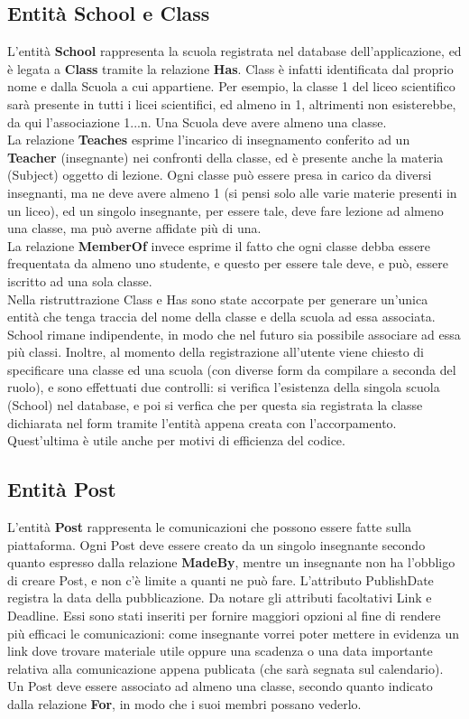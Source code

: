 \documentclass[Lau, binding=0.6cm, oneside]{sapthesis}
\begin{document}
\subsection{Entità School e Class}
L'entità \textbf{School} rappresenta la scuola registrata nel database dell'applicazione, ed è legata a \textbf{Class} tramite la relazione \textbf{Has}. Class è infatti identificata dal proprio nome e dalla Scuola a cui appartiene. Per esempio, la classe 1 del liceo scientifico sarà presente in tutti i licei scientifici, ed almeno in 1, altrimenti non esisterebbe, da qui l'associazione 1...n. Una Scuola deve avere almeno una classe.\\
La relazione \textbf{Teaches} esprime l'incarico di insegnamento conferito ad un \textbf{Teacher} (insegnante) nei confronti della classe, ed è presente anche la materia (Subject) oggetto di lezione. Ogni classe può essere presa in carico da diversi insegnanti, ma ne deve avere almeno 1 (si pensi solo alle varie materie presenti in  un liceo), ed un singolo insegnante, per essere tale, deve fare lezione ad almeno una classe, ma può averne affidate più di una.\\
La relazione \textbf{MemberOf} invece esprime il fatto che ogni classe debba essere frequentata da almeno uno studente, e questo per essere tale deve, e può, essere iscritto ad una sola classe.\\
Nella ristruttrazione Class e Has sono state accorpate per generare un'unica entità che tenga traccia del nome della classe e della scuola ad essa associata. School rimane indipendente, in modo che nel futuro sia possibile associare ad essa più classi. Inoltre, al momento della registrazione
all'utente viene chiesto di specificare una classe ed una scuola (con diverse form da compilare a seconda del ruolo), e sono effettuati due controlli: si verifica l'esistenza della singola scuola (School) nel database, e poi si verfica che per questa sia registrata la classe dichiarata nel form tramite l'entità appena creata con l'accorpamento. Quest'ultima è utile anche per motivi di efficienza del codice.

\subsection{Entità Post}
L'entità \textbf{Post} rappresenta le comunicazioni che possono essere fatte sulla piattaforma. Ogni Post deve essere creato da un singolo insegnante secondo quanto espresso dalla relazione \textbf{MadeBy}, mentre un insegnante non ha l'obbligo di creare Post, e non c'è limite a quanti ne può fare. L'attributo PublishDate registra la data della pubblicazione.
Da notare gli attributi facoltativi Link e Deadline. Essi sono stati inseriti per fornire maggiori opzioni al fine di rendere più efficaci le comunicazioni: come insegnante vorrei poter mettere in evidenza un link dove trovare materiale utile oppure una scadenza o una data importante relativa alla comunicazione appena publicata (che sarà segnata sul calendario).\\
Un Post deve essere associato ad almeno una classe, secondo quanto indicato dalla relazione \textbf{For}, in modo che i suoi membri possano vederlo.
\end{document}

